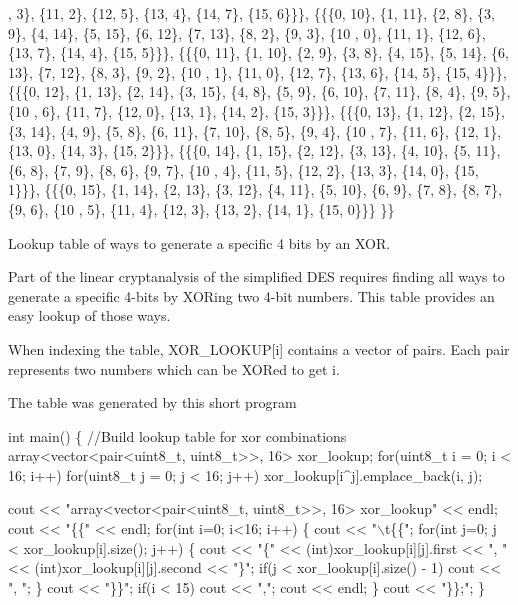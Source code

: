 \begin{DoxyCode}
      , 3\}, \{11, 2\}, \{12, 5\}, \{13, 4\}, \{14, 7\}, \{15, 6\}\}\},
                \{\{\{0, 10\}, \{1, 11\}, \{2, 8\}, \{3, 9\}, \{4, 14\}, \{5, 15\}, \{6, 12\}, \{7, 13\}, \{8, 2\}, \{9, 3\}, \{10
      , 0\}, \{11, 1\}, \{12, 6\}, \{13, 7\}, \{14, 4\}, \{15, 5\}\}\},
                \{\{\{0, 11\}, \{1, 10\}, \{2, 9\}, \{3, 8\}, \{4, 15\}, \{5, 14\}, \{6, 13\}, \{7, 12\}, \{8, 3\}, \{9, 2\}, \{10
      , 1\}, \{11, 0\}, \{12, 7\}, \{13, 6\}, \{14, 5\}, \{15, 4\}\}\},
                \{\{\{0, 12\}, \{1, 13\}, \{2, 14\}, \{3, 15\}, \{4, 8\}, \{5, 9\}, \{6, 10\}, \{7, 11\}, \{8, 4\}, \{9, 5\}, \{10
      , 6\}, \{11, 7\}, \{12, 0\}, \{13, 1\}, \{14, 2\}, \{15, 3\}\}\},
                \{\{\{0, 13\}, \{1, 12\}, \{2, 15\}, \{3, 14\}, \{4, 9\}, \{5, 8\}, \{6, 11\}, \{7, 10\}, \{8, 5\}, \{9, 4\}, \{10
      , 7\}, \{11, 6\}, \{12, 1\}, \{13, 0\}, \{14, 3\}, \{15, 2\}\}\},
                \{\{\{0, 14\}, \{1, 15\}, \{2, 12\}, \{3, 13\}, \{4, 10\}, \{5, 11\}, \{6, 8\}, \{7, 9\}, \{8, 6\}, \{9, 7\}, \{10
      , 4\}, \{11, 5\}, \{12, 2\}, \{13, 3\}, \{14, 0\}, \{15, 1\}\}\},
                \{\{\{0, 15\}, \{1, 14\}, \{2, 13\}, \{3, 12\}, \{4, 11\}, \{5, 10\}, \{6, 9\}, \{7, 8\}, \{8, 7\}, \{9, 6\}, \{10
      , 5\}, \{11, 4\}, \{12, 3\}, \{13, 2\}, \{14, 1\}, \{15, 0\}\}\}
        \}\}
\end{DoxyCode}


Lookup table of ways to generate a specific 4 bits by an X\+OR. 

Part of the linear cryptanalysis of the simplified D\+ES requires finding all ways to generate a specific 4-\/bits by X\+O\+Ring two 4-\/bit numbers. This table provides an easy lookup of those ways.

When indexing the table, X\+O\+R\+\_\+\+L\+O\+O\+K\+UP\mbox{[}i\mbox{]} contains a vector of pairs. Each pair represents two numbers which can be X\+O\+Red to get i.

The table was generated by this short program 
\begin{DoxyCode}
\textcolor{keywordtype}{int} main()
\{
    \textcolor{comment}{//Build lookup table for xor combinations}
    array<vector<pair<uint8\_t, uint8\_t>>, 16> xor\_lookup;
    \textcolor{keywordflow}{for}(uint8\_t i = 0; i < 16; i++)
        \textcolor{keywordflow}{for}(uint8\_t j = 0; j < 16; j++)
            xor\_lookup[i^j].emplace\_back(i, j);

    cout << \textcolor{stringliteral}{"array<vector<pair<uint8\_t, uint8\_t>>, 16> xor\_lookup"} << endl;
    cout << \textcolor{stringliteral}{"\{\{"} << endl;
    \textcolor{keywordflow}{for}(\textcolor{keywordtype}{int} i=0; i<16; i++)
    \{
        cout << \textcolor{stringliteral}{"\(\backslash\)t\{\{"};
        \textcolor{keywordflow}{for}(\textcolor{keywordtype}{int} j=0; j < xor\_lookup[i].size(); j++)
        \{
            cout << \textcolor{stringliteral}{"\{"} << (int)xor\_lookup[i][j].first << \textcolor{stringliteral}{", "} << (\textcolor{keywordtype}{int})xor\_lookup[i][j].second << "\}";
            if(j < xor\_lookup[i].size() - 1) cout << ", ";
        \}
        cout << "\}\}";
        if(i < 15) cout << ",";
        cout << endl;
    \}
    cout << "\}\};";
\}
\end{DoxyCode}
 